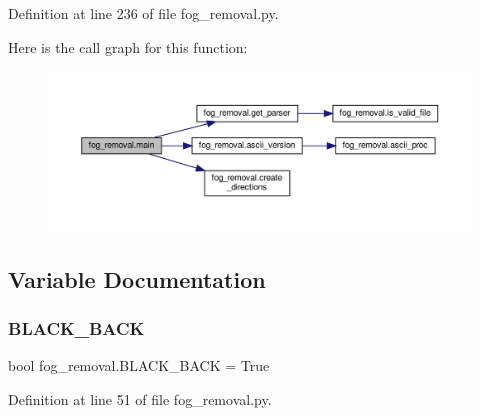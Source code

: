 Definition at line 236 of file fog\+\_\+removal.\+py.

Here is the call graph for this function\+:\nopagebreak
\begin{figure}[H]
\begin{center}
\leavevmode
\includegraphics[width=350pt]{namespacefog__removal_a427a577da8405e5624962d7ef722aadf_cgraph}
\end{center}
\end{figure}


\subsection{Variable Documentation}
\mbox{\label{namespacefog__removal_ad88aa1ec890d366b2f2c71131bc1f657}} 
\subsubsection{\texorpdfstring{B\+L\+A\+C\+K\+\_\+\+B\+A\+CK}{BLACK\_BACK}}
{\footnotesize\ttfamily bool fog\+\_\+removal.\+B\+L\+A\+C\+K\+\_\+\+B\+A\+CK = True}



Definition at line 51 of file fog\+\_\+removal.\+py.

